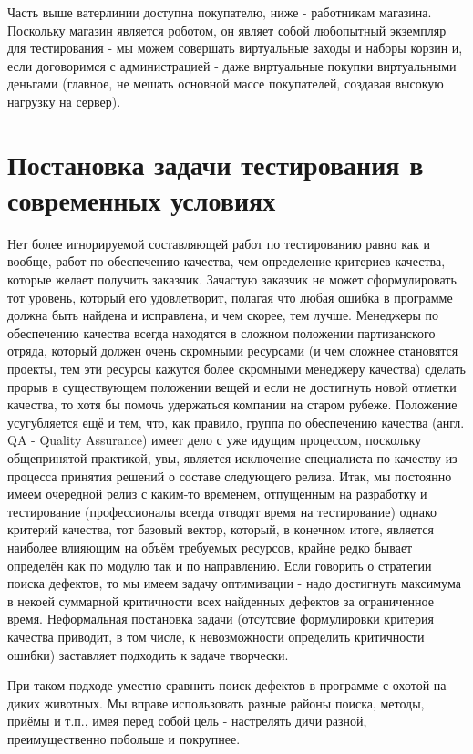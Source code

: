 \documentclass[a4paper]{book}
\def\tp{т.\thinspace п.}
\begin{document}
Часть выше ватерлинии доступна покупателю, ниже - работникам
магазина. Поскольку магазин является роботом, он являет собой
любопытный экземпляр для тестирования - мы можем совершать
виртуальные заходы и наборы корзин и, если договоримся с
администрацией - даже виртуальные покупки виртуальными деньгами
(главное, не мешать основной массе покупателей, создавая высокую
нагрузку на сервер).


\chapter{Постановка задачи тестирования в современных условиях}

Нет более игнорируемой составляющей работ по тестированию равно
как и вообще, работ по обеспечению качества, чем определение
критериев качества, которые желает получить заказчик. Зачастую
заказчик не может сформулировать тот уровень, который его
удовлетворит, полагая что любая ошибка в программе должна быть
найдена и исправлена, и чем скорее, тем лучше. Менеджеры по
обеспечению качества всегда находятся в сложном положении
партизанского отряда, который должен очень скромными ресурсами (и
чем сложнее становятся проекты, тем эти ресурсы кажутся более
скромными менеджеру качества) сделать прорыв в существующем
положении вещей и если не достигнуть новой отметки качества, то
хотя бы помочь удержаться компании на старом рубеже. Положение
усугубляется ещё и тем, что, как правило, группа по обеспечению
качества (англ. QA - Quality Assurance) имеет дело с уже идущим
процессом, поскольку общепринятой практикой, увы, является
исключение специалиста по качеству из процесса принятия решений о
составе следующего релиза. Итак, мы постоянно имеем очередной
релиз с каким-то временем, отпущенным на разработку и
тестирование (профессионалы всегда отводят время на тестирование)
однако критерий качества, тот базовый вектор, который, в конечном
итоге, является наиболее влияющим на объём требуемых ресурсов,
крайне редко бывает определён как по модулю так и по
направлению. Если говорить о стратегии поиска дефектов, то мы
имеем задачу оптимизации - надо достигнуть максимума в некоей
суммарной критичности всех найденных дефектов за ограниченное
время. Неформальная постановка задачи (отсутсвие формулировки
критерия качества приводит, в том числе, к невозможности
определить критичности ошибки) заставляет подходить к задаче
творчески.

При таком подходе уместно сравнить поиск дефектов в программе с
охотой на диких животных. Мы вправе использовать разные районы
поиска, методы, приёмы и \tp, имея перед собой цель - настрелять
дичи разной, преимущественно побольше и покрупнее.
\end{document}
